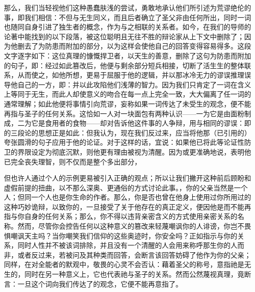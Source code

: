 那么，我们当轻视他们这种愚蠢肤浅的尝试，勇敢地承认他们所引述为荒谬绝伦的事，即我们相信：不但与无生同义，而且后者确立了圣父非由任何所出，同时一词也随同自身引进了独生者的概念，作为与之相联的关系者。如今，在我们的导师的论著中能找到的以下段落，被这位聪明且无往不胜的辩论家从上下文中删除了；因为他删去了为防患而附加的部分，以为这样会使他自己的回答变得容易得多。这段文字逐字如下：这位真理的慷慨捍卫者，以天生的善意，删除了这句为防患而附加的句子，即：经过如此篡改后，他便与剩余部分短兵相接，切断了活生生的整体联系，从而使之，如他所想，更易于屈服于他的逻辑，并以那冰冷无力的谬误推理误导他自己的一方，即：并以此攻陷他们浅薄的智力。因为我们只肯定了一词在含义上等同于无生，而此人却使意义的吻合在每一点上完全一致，大大偏离了任一词的通常理解；如此他便将事情引向荒谬，妄称如果一词传达了未受生的观念，便不能再指与圣子的任何关系。这恰如一人对一块面包有两种认识——一为它是由面粉制成，二为它是食用者的食物——却对告诉他这件事的人争辩，用与相同的谬误：即的三段论的思想正是如此：但我认为，现在我们反过来，应当将他那（已引用的）夸张圆滑的句子应用于他的论证。对于这样的话，宜说：如果他已将此等论证性防卫的界限设定为彻底沉默，则他更有理由被视为清醒。因为或更准确地说，表明他已完全丧失理智，则不仅而是整个多出部分，\par

但也许人通过个人的示例更易被引入正确的观点；所以让我们撇开这种前后顾盼和虚假前提的扭曲，以不那么深奥、更通俗的方式讨论此事。，你的父亲当然是一个人；但同一个人也是你生命的作者。那么，你是否也曾在他身上使用过你所用过的这种巧妙诡辩，以致你的，一旦接受了关于他存在的真正定义，便因他是而不能再指与你自身的任何关系；那么，你不得以违背亲密含义的方式使用亲密关系的名称。然而，尽管你会控告任何以这种意义的篡改来轻蔑嘲讽你的人诽谤，你岂不畏惧嘲讽天主吗？当你嘲笑我们信仰的这些奥迹时，你安全吗？正如指示与你的关系，同时人性并不被该词排除，并且没有一个清醒的人会用来称呼那生你的人而非，或者反过来，若被问及其种类而回答，会断言该回答妨碍了他作为你的父亲；同样，在对全能者的默观中，敬畏的心灵不会否认：藉着圣父的称号，意指祂是无生的，同时在另一种意义上，它也代表祂与圣子的关系。然而公然蔑视真理，竟断言：一旦这个词向我们传达了的观念，它便不能再意指了。\par

